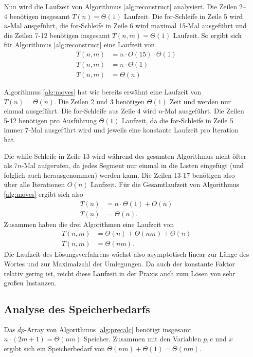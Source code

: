 \documentclass[a4paper,10pt,ngerman]{scrartcl}
\begin{document}
Nun wird die Laufzeit von Algorithmus \ref{alg:reconstruct} analysiert.
Die Zeilen 2--4 benötigen insgesamt $T(n) = \Theta(1)$ Laufzeit. 
Die for-Schleife in Zeile 5 wird $n$-Mal ausgeführt, die for-Schleife in Zeile 6 wird maximal 15-Mal ausgeführt und die Zeilen 7-12 benötigen insgesamt $T(n,m) = \Theta(1)$ Laufzeit. 
So ergibt sich für Algorithmus \ref{alg:reconstruct} eine Laufzeit von 
\begin{align*}
    T(n,m) &= n \cdot O(15) \cdot \Theta(1)\\
    T(n, m) &= n \cdot \Theta(1)\\
    T(n, m) &= \Theta(n)
\end{align*}

Algorithmus \ref{alg:moves} hat wie bereits erwähnt eine Laufzeit von $T(n) = \Theta(n)$. Die Zeilen 2 und 3 benötigen $\Theta(1)$ Zeit und werden nur einmal ausgeführt. 
Die for-Schleife aus Zeile 4 wird $n$-Mal ausgeführt. 
Die Zeilen 5-12 benötigen pro Ausführung $\Theta(1)$ Laufzeit, da die for-Schleife in Zeile 5 immer 7-Mal ausgeführt wird und jeweils eine konstante Laufzeit pro Iteration hat. 

Die while-Schleife in Zeile 13 wird während des gesamten Algorithmus nicht öfter als $7n$-Mal aufgerufen, da jedes Segment nur einmal in die Listen eingefügt (und folglich auch herausgenommen) werden kann. Die Zeilen 13-17 benötigen also über alle Iterationen $O(n)$ Laufzeit.
Für die Gesamtlaufzeit von Algorithmus \ref{alg:moves} ergibt sich also 
\begin{align*}
    T(n) &= n \cdot \Theta(1) + O(n)\\
    T(n) &= \Theta(n).
\end{align*}
Zusammen haben die drei Algorithmen eine Laufzeit von 
\begin{align*}
    T(n, m) &= \Theta(n) + \Theta(nm) + \Theta(n)\\
    T(n, m) &= \Theta(nm).
\end{align*}
Die Laufzeit des Lösungsverfahrens wächst also asymptotisch linear zur Länge des Wortes und zur Maximalzahl der Umlegungen. 
Da auch der konstante Faktor relativ gering ist, reicht diese Laufzeit in der Praxis auch zum Lösen von sehr großen Instanzen.

\subsection{Analyse des Speicherbedarfs}
Das $dp$-Array von Algorithmus \ref{alg:precalc} benötigt insgesamt $n \cdot (2m + 1) = \Theta(nm)$ Speicher. Zusammen mit den Variablen $p, e$ und $x$ ergibt sich ein Speicherbedarf von $\Theta(nm) + \Theta(1) = \Theta(nm)$.
\end{document}
